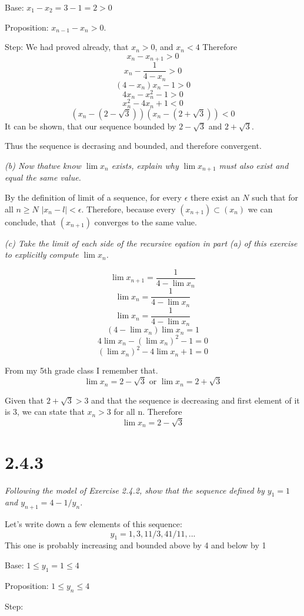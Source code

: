 \documentclass[11pt,oneside,titlepage]{article}
\begin{document}
Base: $x_1 - x_2 = 3 - 1 = 2 > 0$

Proposition: $x_{n - 1} - x_n > 0$.

Step:
We had proved already, that $x_n > 0$, and $x_n < 4$ Therefore
$$x_n - x_{n + 1} > 0$$
$$ x_n - \frac{1}{4 - x_n} > 0$$
$$ (4 - x_n)x_n - 1 > 0$$
$$ 4 x_n - x_n^2 - 1 > 0$$
$$x_n^2 - 4 x_n + 1 < 0$$
$$(x_n - (2 - \sqrt{3}))(x_n - (2 + \sqrt{3})) < 0$$
It can be shown, that our sequence bounded by $2 - \sqrt{3}$ and $2 + \sqrt{3}$.

Thus the sequence is decrasing and bounded, and therefore convergent.

\textit{(b) Now thatwe know $\lim x_n$ exists, explain why $\lim x_{n + 1}$
  must also exist and equal the same value.}

By the definition of limit of a sequence, for every $\epsilon$ there exist an
$N$ such that for all $n \geq N$ $|x_n - l| < \epsilon$. Therefore, because
every $(x_{n + 1}) \subset (x_n)$ we can conclude, that $(x_{n + 1})$ converges
to the same value.

\textit{(c) Take the limit of each side of the recursive eqation in part (a) of
  this exercise to explicitly compute $\lim x_n$.}

$$\lim x_{n + 1} = \frac{1}{4 - \lim x_n}$$
$$\lim x_n = \frac{1}{4 - \lim x_n}$$
$$\lim x_n = \frac{1}{4 - \lim x_n}$$
$$(4 - \lim x_n)\lim x_n = 1$$
$$4 \lim x_n - (\lim x_n) ^ 2  - 1= 0$$
$$ (\lim x_n) ^ 2 - 4 \lim x_n  + 1= 0$$

From my 5th grade class I remember that.
$$\lim x_n = 2 -  \sqrt{3} \text{ or } \lim x_n = 2 +  \sqrt{3}$$

Given that $2 + \sqrt{3} > 3$ and that the sequence is decreasing and first
element of it is $3$, we can state that $x_n > 3$ for all n. Therefore
$$\lim x_n = 2 - \sqrt{3}$$

\section*{2.4.3}
\textit{Following the model of Exercise 2.4.2, show that the sequence defined
  by $y_1 = 1$ and $y_{n + 1} = 4 - 1/y_n$.}

Let's write down a few elements of this sequence:
$$y_1 = 1, 3, 11/3, 41/11, ...$$
This one is probably increasing and bounded above by 4 and below by 1

Base: $1 \leq y_1 = 1 \leq 4$

Proposition: $1 \leq y_n \leq 4$

Step:
\end{document}

